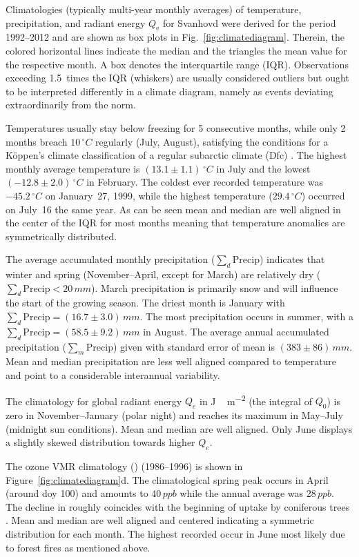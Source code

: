 \documentclass[bg, manuscript]{copernicus}
\begin{document}
Climatologies (typically multi-year monthly averages) of temperature, precipitation, and radiant energy $Q_\mathrm{e}$ for Svanhovd were derived for the period 1992--2012 and are shown as box plots in Fig.~\ref{fig:climatediagram}. Therein, the colored horizontal lines indicate the median and the triangles the mean value for the respective month. A box denotes the interquartile range (IQR). Observations exceeding 1.5~times the IQR (whiskers) are usually considered outliers but ought to be interpreted differently in a climate diagram, namely as events deviating extraordinarily from the norm.

Temperatures usually stay below freezing for 5 consecutive months, while only 2 months breach $10\,\unit{^\circ C}$ regularly (July, August), satisfying the conditions for a K\"{o}ppen's climate classification of a regular subarctic climate (Dfc) \citep[e.g.][]{SD:Beck2018}. The highest monthly average temperature is $(13.1\pm 1.1)\,\unit{^\circ C}$ in July and the lowest $(-12.8\pm 2.0)\,\unit{^\circ C}$ in February. The coldest ever recorded temperature was $-45.2\,\unit{^\circ C}$ on January~27, 1999, while the highest temperature ($29.4\,\unit{^\circ C}$) occurred on July~16 the same year. As can be seen mean and median are well aligned in the center of the IQR for most months meaning that temperature anomalies are symmetrically distributed.

The average accumulated monthly precipitation ($\sum_d\mathrm{Precip}$) indicates that winter and spring (November--April, except for March) are relatively dry ($\sum_d\mathrm{Precip} < 20\,\unit{mm}$). March precipitation is primarily snow and will influence the start of the growing season. The driest month is January with $\sum_d\mathrm{Precip} = (16.7\pm 3.0)\,\unit{mm}$. The most precipitation occurs in summer, with a $\sum_d\mathrm{Precip} = (58.5\pm 9.2)\,\unit{mm}$ in August. The average annual accumulated precipitation ($\sum_m\mathrm{Precip}$) given with standard error of mean is $(383\pm 86)\,\unit{mm}$. Mean and median precipitation are less well aligned compared to temperature and point to a considerable interannual variability.

The climatology for global radiant energy $Q_e$ in \unit{J\,m^{-2}} (the integral of $Q_0$) is zero in November--January (polar night) and reaches its maximum in May--July (midnight sun conditions). Mean and median are well aligned. Only June displays a slightly skewed distribution towards higher $Q_e$.

The ozone VMR climatology () (1986--1996) is shown in Figure~\ref{fig:climatediagram}d. The climatological spring peak occurs in April (around \unit{doy} 100) and amounts to $40\,\unit{ppb}$ while the annual average  was $28\,\unit{ppb}$. The decline in  roughly coincides with the beginning of  uptake by coniferous trees \citep{TB:Kolari2007, TP:Wallin2013}. Mean and median are well aligned and centered indicating a symmetric distribution for each month. The highest recorded  occur in June most likely due to forest fires as mentioned above.
\end{document}
